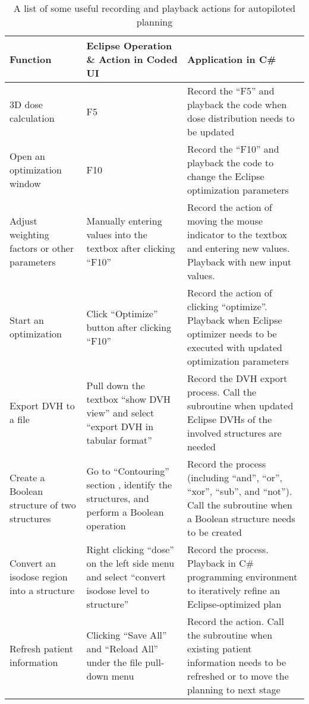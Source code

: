 \begin{table}
\caption{A list of some useful recording and playback actions for autopiloted planning}
\label{table:table2.1}
  \begin{tabular}{ | p{1.7in} | p{2in}  | p{2in} | }  
    \hline
    Function & Eclipse Operation \& Action in Coded UI & Application in C\# \\ \hline
    3D dose calculation & F5 & Record the ``F5'' and playback the code when dose distribution needs to be updated \\ \hline
    Open an optimization window& F10 & Record the ``F10'' and playback the code to change the Eclipse optimization parameters \\ \hline
    Adjust weighting factors or other parameters & Manually entering values into the textbox after clicking ``F10'' & Record the action of moving the mouse indicator to the textbox and entering new values. Playback with new input values. \\ \hline
    Start an optimization & Click ``Optimize'' button after clicking ``F10'' & Record the action of clicking ``optimize''. Playback when Eclipse optimizer needs to be executed with updated optimization parameters \\ \hline
    Export DVH to a file & Pull down the textbox ``show DVH view'' and select ``export DVH in tabular format'' & Record the DVH export process. Call the subroutine when updated Eclipse DVHs of the involved structures are needed \\ \hline
    Create a Boolean structure of two structures & Go to ``Contouring'' section , identify the structures, and perform a  Boolean operation & Record the process (including ``and'', ``or'', ``xor'', ``sub'', and ``not'').  Call the subroutine when a Boolean structure needs to be created \\ \hline
    Convert an isodose region into a structure & Right clicking ``dose'' on the left side menu and select ``convert isodose level to structure'' & Record the process. Playback in C\# programming environment to iteratively refine an Eclipse-optimized plan \\ \hline
    Refresh patient information & Clicking ``Save All'' and ``Reload All'' under the file pull-down menu & Record the action. Call the subroutine when existing patient information needs to be refreshed or to move the planning to next stage \\ \hline
  \end{tabular}
\end{table}

